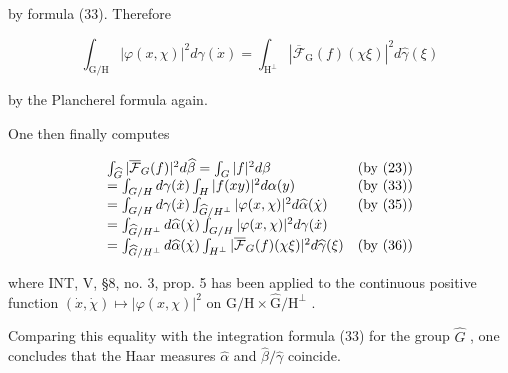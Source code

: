 by formula (33). Therefore

\[
\int_ {\mathrm{G/H}} | \varphi (x, \chi) | ^ {2} d \gamma (\dot {x}) = \int_ {\mathrm{H} ^ {\perp}} | \overline {{\mathcal {F}}} _ {\mathrm{G}} (f) (\chi \xi) | ^ {2} d \widehat {\gamma} (\xi)\tag{36}
\]

by the Plancherel formula again.

One then finally computes

\[
\begin{array}{l l} \int_ {\widehat {G}} | \overline {{\mathcal {F}}} _ {G} (f) | ^ {2} d \widehat {\beta} = \int_ {G} | f | ^ {2} d \beta & (\text {by (23)}) \\ = \int_ {G / H} d \gamma (\dot {x}) \int_ {H} | f (x y) | ^ {2} d \alpha (y) & (\text {by (33)}) \\ = \int_ {G / H} d \gamma (\dot {x}) \int_ {\widehat {G} / H ^ {\perp}} | \varphi (x, \chi) | ^ {2} d \widehat {\alpha} (\dot {\chi}) & (\text {by (35)}) \\ = \int_ {\widehat {G} / H ^ {\perp}} d \widehat {\alpha} (\dot {\chi}) \int_ {G / H} | \varphi (x, \chi) | ^ {2} d \gamma (\dot {x}) \\ = \int_ {\widehat {G} / H ^ {\perp}} d \widehat {\alpha} (\dot {\chi}) \int_ {H ^ {\perp}} | \overline {{\mathcal {F}}} _ {G} (f) (\chi \xi) | ^ {2} d \widehat {\gamma} (\xi) & (\text {by (36)}) \end{array}
\]

where INT, V, §8, no. 3, prop. 5 has been applied to the continuous positive function \((\dot{x},\dot{\chi})\mapsto |\varphi (x,\chi)|^{2}\) on \(\mathrm{G / H}\times \widehat{\mathrm{G}} /\mathrm{H}^{\perp}\) .

Comparing this equality with the integration formula (33) for the group \(\widehat{G}\) , one concludes that the Haar measures \(\widehat{\alpha}\) and \(\widehat{\beta}/\widehat{\gamma}\) coincide.

